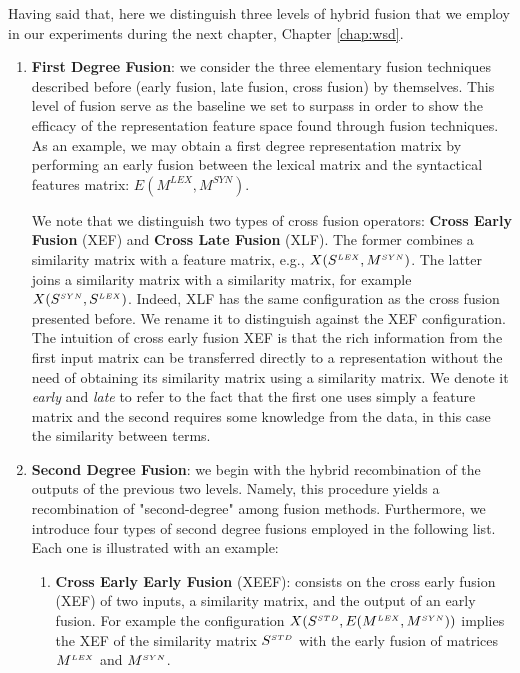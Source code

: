 Having said that, here we distinguish three levels of hybrid fusion that we employ in our experiments during the next chapter, Chapter \ref{chap:wsd}.  \begin{enumerate}
\item \textbf{First Degree Fusion}: we  consider the  three elementary fusion techniques described before (early fusion, late fusion, cross fusion) by themselves.  This level of fusion serve as the baseline we set to surpass in order to show the efficacy of the representation feature space found through fusion techniques.
As an example, we may obtain a first degree representation matrix by performing an early fusion between the lexical matrix and the syntactical features matrix: $E(M^{LEX}, M^{SYN})$. 

We note that we distinguish two types of cross fusion operators: \textbf{Cross Early Fusion} (XEF) and \textbf{Cross Late Fusion} (XLF). The former combines a similarity matrix with a feature matrix, e.g., $X(S^{\scriptscriptstyle LEX}, M^{\scriptscriptstyle SYN})$. The latter joins a similarity matrix with a similarity matrix, for example $X(S^{\scriptscriptstyle SYN}, S^{\scriptscriptstyle LEX})$. Indeed, XLF has the same configuration as the cross fusion presented before. We rename it to distinguish against the XEF configuration. The intuition of cross early fusion XEF is that the rich information from the first input matrix can be transferred directly to a representation without the need of obtaining its similarity matrix using a similarity matrix. We denote it \textit{early} and \textit{late} to refer to the fact that the first one uses simply a feature matrix and the second requires some knowledge from the data, in this case the similarity between terms.

\item \textbf{Second Degree Fusion}:  we  begin with the hybrid recombination of the outputs of the previous two levels. Namely, this procedure  yields a recombination of "second-degree" among fusion methods. Furthermore, we introduce four types of second degree fusions employed in the following list. Each one is illustrated with an example:

\begin{enumerate}

\item \textbf{Cross Early Early Fusion} (XEEF): consists on the cross early fusion (XEF) of two inputs, a similarity matrix, and the output of an early fusion. For example the configuration $X(S^{\scriptscriptstyle STD}, E(M^{\scriptscriptstyle LEX}, M^{\scriptscriptstyle SYN}))$ implies the XEF of the similarity matrix $S^{\scriptscriptstyle STD}$ with the early fusion of matrices $M^{\scriptscriptstyle LEX}$ and $M^{\scriptscriptstyle SYN}$.


\end{enumerate}
\end{enumerate}
